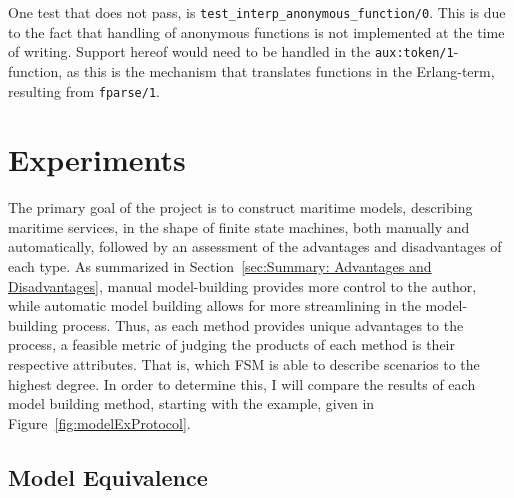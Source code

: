 One test that does not pass, is \lstinline{test_interp_anonymous_function/0}. This is due to the fact that handling of anonymous functions is not implemented at the time of writing. Support hereof would need to be handled in the \linebreak \lstinline{aux:token/1}-function, as this is the mechanism that translates functions in the Erlang-term, resulting from \lstinline{fparse/1}.

\section{Experiments}

The primary goal of the project is to construct maritime models, describing maritime services, in the shape of finite state machines, both manually and automatically, followed by an assessment of the advantages and disadvantages of each type. As summarized in Section~\ref{sec:Summary: Advantages and Disadvantages}, manual model-building provides more control to the author, while automatic model building allows for more streamlining in the model-building process. Thus, as each method provides unique advantages to the process, a feasible metric of judging the products of each method is their respective attributes. That is, which FSM is able to describe scenarios to the highest degree. In order to determine this, I will compare the results of each model building method, starting with the example, given in Figure~\ref{fig:modelExProtocol}.

\subsection{Model Equivalence}

